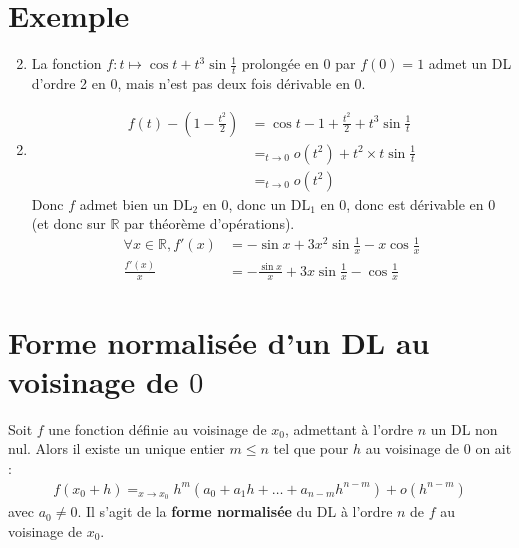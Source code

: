 \documentclass[../main.tex]{subfiles}
\begin{document}
\section{Exemple}
\begin{tcolorbox}[title=Exemple 25.43.2, title filled=false, colframe=darkgreen, colback=darkgreen!10!white]
    \begin{enumerate}
        \setcounter{enumi}{1}
        \item La fonction $f:t\mapsto \cos t + t^3 \sin \frac{1}{t}$ prolongée en $0$ par $f(0) = 1$ admet un DL d'ordre 2 en $0$, mais n'est pas deux fois dérivable en $0$. 
    \end{enumerate}
\end{tcolorbox}

\begin{enumerate}
    \setcounter{enumi}{1}
    \item \begin{align*}
        f(t) - \left( 1 - \frac{t^2}{2} \right) &= \cos t - 1 + \frac{t^2}{2} + t^3 \sin \frac{1}{t} \\
        &=_{t\to 0} o(t^2) + t^2 \times t \sin \frac{1}{t} \\
        &=_{t\to 0} o(t^2)
    \end{align*}
    Donc $f$ admet bien un $\text{DL}_2$ en $0$, donc un $\text{DL}_1$ en $0$, donc est dérivable en $0$ (et donc sur $\mathbb{R}$ par théorème d'opérations). 
    \begin{align*}
        \forall x \in \mathbb{R}, f'(x) &= -\sin x + 3x^2 \sin \frac{1}{x} - x\cos \frac{1}{x} \\
        \frac{f'(x)}{x} &= -\frac{\sin x}{x} + 3x \sin \frac{1}{x} - \cos \frac{1}{x}
    \end{align*}
\end{enumerate}

\section{Forme normalisée d'un DL au voisinage de $0$}
\begin{tcolorbox}[title=Propostion 25.50, title filled=false, colframe=lightblue, colback=lightblue!10!white]
    Soit $f$ une fonction définie au voisinage de $x_0$, admettant à l'ordre $n$ un DL non nul. Alors il existe un unique entier $m \leq n$ tel que pour $h$ au voisinage de $0$ on ait : 
    \begin{align*}
        f(x_0 + h) =_{x\to x_0} h^m(a_0 + a_1 h + \ldots + a_{n-m} h^{n-m}) + o(h^{n-m})
    \end{align*}
    avec $a_0 \neq 0$. Il s'agit de la \textbf{forme normalisée} du DL à l'ordre $n$ de $f$ au voisinage de $x_0$. 
\end{tcolorbox}
\end{document}
